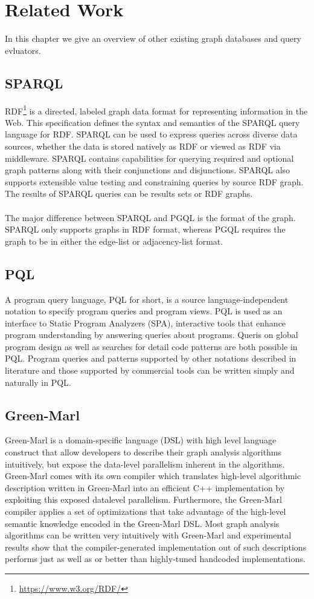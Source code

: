 \documentclass[11pt,singlecolumn]{scrartcl}
\begin{document}
\section{Related Work}
In this chapter we give an overview of other existing graph databases and query evluators.

\subsection{SPARQL}
RDF\footnote{\url{https://www.w3.org/RDF/}} is a directed, labeled graph data format for representing information in the Web. This specification defines the syntax and semantics of the SPARQL query language for RDF. SPARQL can be used to express queries across diverse data sources, whether the data is stored natively as RDF or viewed as RDF via middleware. SPARQL contains capabilities for querying required and optional graph patterns along with their conjunctions and disjunctions. SPARQL also supports extensible value testing and constraining queries by source RDF graph. The results of SPARQL queries can be results sets or RDF graphs.\\\\
The major difference between SPARQL and PGQL is the format of the graph. SPARQL only supports graphs in RDF format, whereas PGQL requires the graph to be in either the edge-list or adjacency-list format.\cite{SPARQL}
\subsection{PQL}
A program query language, PQL for short, is a source language-independent notation to specify program queries and program views. PQL is used as an interface to Static Program Analyzers (SPA), interactive tools that enhance program understanding by answering queries about programs. Queris on global program design as well as searches for detail code patterns are both possible in PQL. Program queries and patterns supported by other notations described in literature and those supported by commercial tools can be written simply and naturally in PQL.\cite {PQL}



\subsection{Green-Marl}
Green-Marl is a domain-specific language (DSL) with high level language construct that allow developers to describe their graph analysis algorithms intuitively, but expose the data-level parallelism inherent in the algorithms. Green-Marl comes with its own compiler which translates high-level algorithmic description written in Green-Marl into an efficient C++ implementation by exploiting this exposed datalevel parallelism. Furthermore, the Green-Marl compiler applies a set of optimizations that take advantage of the high-level semantic knowledge encoded in the Green-Marl DSL. Most graph analysis algorithms can be written very intuitively with Green-Marl and experimental results show that the compiler-generated implementation out of such descriptions performs just as well as or better than highly-tuned handcoded implementations.\cite {Greenmarl}
\end{document}
